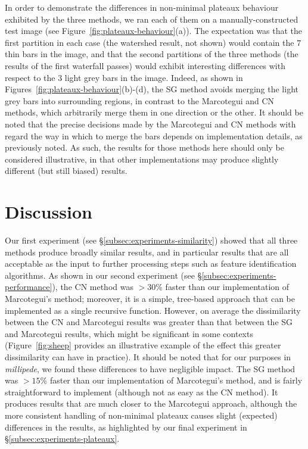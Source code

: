 \documentclass[preprint,a4paper]{elsarticle}
\begin{document}
In order to demonstrate the differences in non-minimal plateaux behaviour exhibited by the three methods, we ran each of them on a manually-constructed test image (see Figure~\ref{fig:plateaux-behaviour}(a)). The expectation was that the first partition in each case (the watershed result, not shown) would contain the $7$ thin bars in the image, and that the second partitions of the three methods (the results of the first waterfall passes) would exhibit interesting differences with respect to the $3$ light grey bars in the image. Indeed, as shown in Figures~\ref{fig:plateaux-behaviour}(b)-(d), the SG method avoids merging the light grey bars into surrounding regions, in contrast to the Marcotegui and CN methods, which arbitrarily merge them in one direction or the other. It should be noted that the precise decisions made by the Marcotegui and CN methods with regard the way in which to merge the bars depends on implementation details, as previously noted. As such, the results for those methods here should only be considered illustrative, in that other implementations may produce slightly different (but still biased) results.

\section{Discussion}
\label{sec:discussion}

Our first experiment (see \S\ref{subsec:experiments-similarity}) showed that all three methods produce broadly similar results, and in particular results that are all acceptable as the input to further processing steps such as feature identification algorithms. As shown in our second experiment (see \S\ref{subsec:experiments-performance}), the CN method was $> 30$\% faster than our implementation of Marcotegui's method; moreover, it is a simple, tree-based approach that can be implemented as a single recursive function. However, on average the dissimilarity between the CN and Marcotegui results was greater than that between the SG and Marcotegui results, which might be significant in some contexts (Figure~\ref{fig:sheep} provides an illustrative example of the effect this greater dissimilarity can have in practice). It should be noted that for our purposes in \emph{millipede}, we found these differences to have negligible impact. The SG method was $> 15$\% faster than our implementation of Marcotegui's method, and is fairly straightforward to implement (although not as easy as the CN method). It produces results that are much closer to the Marcotegui approach, although the more consistent handling of non-minimal plateaux causes slight (expected) differences in the results, as highlighted by our final experiment in \S\ref{subsec:experiments-plateaux}.
\end{document}
